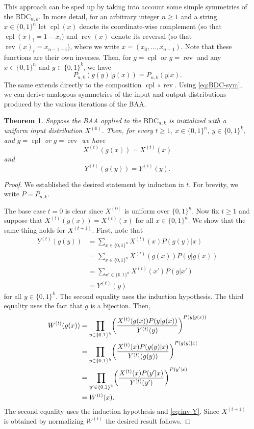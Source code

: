 \documentclass[11pt]{article}
\newcommand{\cpl}{\operatorname{cpl}}
\newcommand{\rev}{\operatorname{rev}}
\newtheorem{theorem}{Theorem}
\newcommand{\bits}{\{0,1\}}
\newcommand{\BDC}{\mathrm{BDC}}
\let\originalleft\left
\let\originalright\right
\renewcommand{\left}{\mathopen{}\mathclose\bgroup\originalleft}
\renewcommand{\right}{\aftergroup\egroup\originalright}
\begin{document}
This approach can be sped up by taking into account some simple symmetries of the $\BDC_{n,k}$.
In more detail, for an arbitrary integer $n\geq 1$ and a string $x\in\bits^n$ let $\cpl(x)$ denote its coordinate-wise complement (so that $\cpl(x)_i=1-x_i$) and $\rev(x)$ denote its reversal (so that $\rev(x)_i=x_{n-1-i}$), where we write $x=(x_0,\dots,x_{n-1})$.
Note that these functions are their own inverses.
Then, for $g=\cpl$ or $g=\rev$ and any $x\in\bits^n$ and $y\in\bits^k$, we have
\begin{equation}\label{eq:BDC-sym}
    P_{n,k}(g(y)|g(x))=P_{n,k}(y|x).
\end{equation}
The same extends directly to the composition $\cpl\circ\rev$.
Using \cref{eq:BDC-sym}, we can derive analogous symmetries of the input and output distributions produced by the various iterations of the BAA.
\begin{theorem}
\label{thm:baa-symmetry}
Suppose the BAA applied to the $\BDC_{n,k}$ is initialized with a uniform input distribution $X^{(0)}$.
Then, for every $t\geq 1$, $x\in\bits^n$, $y\in\bits^k$, and $g=\cpl$ or $g=\rev$ we have
\begin{equation*}
    X^{(t)}(g(x))=X^{(t)}(x)
\end{equation*}
and
\begin{equation*}
    Y^{(t)}(g(y))=Y^{(t)}(y).
\end{equation*}
\end{theorem}
\begin{proof}
    We established the desired statement by induction in $t$.
    For brevity, we write $P=P_{n,k}$.
    
    The base case $t=0$ is clear since $X^{(0)}$ is uniform over $\bits^n$.
    Now fix $t\geq 1$ and suppose that $X^{(t)}(g(x))=X^{(t)}(x)$ for all $x\in\bits^n$.
    We show that the same thing holds for $X^{(t+1)}$.
    First, note that
    \begin{align}
        Y^{(t)}(g(y)) &= \sum_{x\in\bits^n}X^{(t)}(x) P(g(y)|x)\nonumber\\
        &= \sum_{x\in\bits^n}X^{(t)}(g(x)) P(y|g(x))\nonumber\\
        &= \sum_{x'\in\bits^n}X^{(t)}(x') P(y|x')\nonumber\\
        &=Y^{(t)}(y)\label{eq:inv-Y}
    \end{align}
    for all $y\in\bits^k$.
    The second equality uses the induction hypothesis.
    The third equality uses the fact that $g$ is a bijection.
    Then,
    \begin{align*}
        W^{(t)}(g(x)) &= \prod_{y\in\bits^k}\left(\frac{X^{(t)}(g(x)) P(y|g(x))}{Y^{(t)}(y)}\right)^{P(y|g(x))}\\
        &=\prod_{y\in\bits^k}\left(\frac{X^{(t)}(x) P(g(y)|x)}{Y^{(t)}(g(y))}\right)^{P(g(y)|x)}\\
        &=\prod_{y'\in\bits^k}\left(\frac{X^{(t)}(x) P(y'|x)}{Y^{(t)}(y')}\right)^{P(y'|x)}\\
        &=W^{(t)}(x).
    \end{align*}
    The second equality uses the induction hypothesis and \cref{eq:inv-Y}.
    Since $X^{(t+1)}$ is obtained by normalizing $W^{(t)}$ the desired result follows.
    \qedhere
\end{proof}
\end{document}
